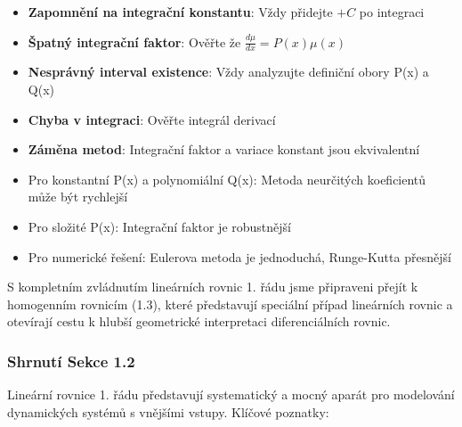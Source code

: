 \vspace{0.8\baselineskip}

\begin{remark}
\begin{itemize}
\item \textbf{Zapomnění na integrační konstantu}: Vždy přidejte $+C$ po integraci
\item \textbf{Špatný integrační faktor}: Ověřte že $\frac{d\mu}{dx} = P(x)\mu(x)$
\item \textbf{Nesprávný interval existence}: Vždy analyzujte definiční obory P(x) a Q(x)
\item \textbf{Chyba v integraci}: Ověřte integrál derivací
\item \textbf{Záměna metod}: Integrační faktor a variace konstant jsou ekvivalentní
\end{itemize}
\end{remark}

\vspace{0.6\baselineskip}

\begin{remark}
\begin{itemize}
\item Pro konstantní P(x) a polynomiální Q(x): Metoda neurčitých koeficientů může být rychlejší
\item Pro složité P(x): Integrační faktor je robustnější
\item Pro numerické řešení: Eulerova metoda je jednoduchá, Runge-Kutta přesnější
\end{itemize}
\end{remark}

\vspace{0.8\baselineskip}

\begin{transition}
S kompletním zvládnutím lineárních rovnic 1. řádu jsme připraveni přejít k homogenním rovnicím (1.3), které představují speciální případ lineárních rovnic a otevírají cestu k hlubší geometrické interpretaci diferenciálních rovnic.
\end{transition}

\vspace{0.8\baselineskip}

\subsubsection*{Shrnutí Sekce 1.2}

Lineární rovnice 1. řádu představují systematický a mocný aparát pro modelování dynamických systémů s vnějšími vstupy. Klíčové poznatky:

